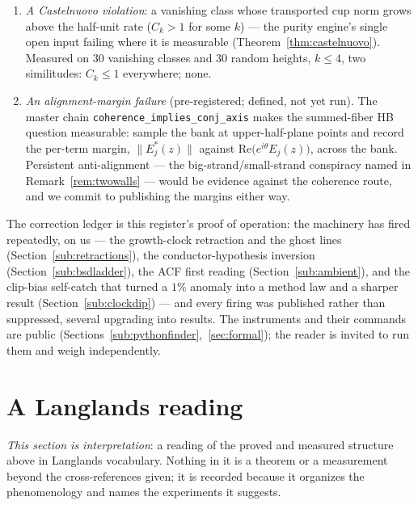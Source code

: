 \documentclass[11pt]{article}
\newcommand{\code}[1]{\texttt{#1}}
\begin{document}
\begin{enumerate}[label=\textup{(F\arabic*)}]
(Section~\ref{sub:functoriality}); none.
\item \emph{A Castelnuovo violation}: a vanishing class whose transported cup norm grows
above the half-unit rate ($C_k>1$ for some $k$) --- the purity engine's single open input
failing where it is measurable (Theorem~\ref{thm:castelnuovo}).  Measured on $30$ vanishing
classes and $30$ random heights, $k\le4$, two similitudes: $C_k\le1$ everywhere; none.
\item \emph{An alignment-margin failure} (pre-registered; defined, not yet run).  The master
chain \code{coherence\_implies\_conj\_axis} makes the summed-fiber HB question measurable: sample
the bank at upper-half-plane points and record the per-term margin, $\|E_j^{*}(z)\|$ against
$\mathrm{Re}\bigl(e^{i\theta}E_j(z)\bigr)$, across the bank.  Persistent anti-alignment ---
the big-strand/small-strand conspiracy named in Remark~\ref{rem:twowalls} --- would be
evidence against the coherence route, and we commit to publishing the margins either way.
\end{enumerate}

The correction ledger is this register's proof of operation: the machinery has fired
repeatedly, on us --- the growth-clock retraction and the ghost lines
(Section~\ref{sub:retractions}), the conductor-hypothesis inversion
(Section~\ref{sub:bsdladder}), the ACF first reading (Section~\ref{sub:ambient}), and the
clip-bias self-catch that turned a $1\%$ anomaly into a method law and a sharper result
(Section~\ref{sub:clockdip}) --- and every firing was published rather than suppressed,
several upgrading into results.  The instruments and their commands are public
(Sections~\ref{sub:pythonfinder},~\ref{sec:formal}); the reader is invited to run them and
weigh independently.

\section{A Langlands reading}\label{sec:langlands}

\emph{This section is interpretation}: a reading of the proved and measured structure above in
Langlands vocabulary.  Nothing in it is a theorem or a measurement beyond the cross-references
given; it is recorded because it organizes the phenomenology and names the experiments it
suggests.
\end{document}
